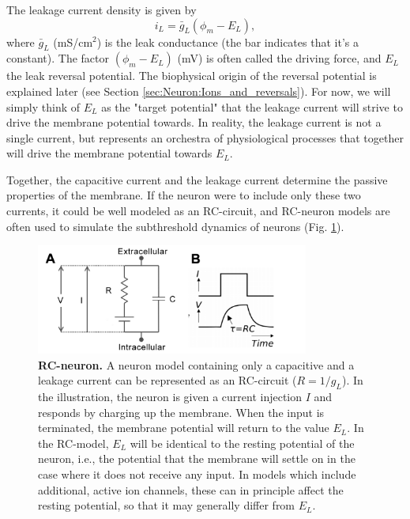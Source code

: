 \subsubsection{}
\label{sec:Neuron:leak}

The leakage current density is given by
\begin{equation}
i_L = \bar{g}_L (\phi_m - E_L),
\label{Neuron:eq:HHleak}
\end{equation}
where $\bar{g}_L$ (mS/cm$^2$) is the leak conductance (the bar indicates that it's a constant). The factor $(\phi_m - E_L)$ (mV) is often called the driving force, and $E_L$ the leak reversal potential. The biophysical origin of the reversal potential is explained later (see Section \ref{sec:Neuron:Ions_and_reversals}). For now, we will simply think of $E_L$ as the "target potential" that the leakage current will strive to drive the membrane potential towards. In reality, the leakage current is not a single current, but represents an orchestra of physiological processes that together will drive the membrane potential towards $E_L$. 

Together, the capacitive current and the leakage current determine the passive properties of the membrane. If the neuron were to include only these two currents, it could be well modeled as an RC-circuit, and RC-neuron models are often used to simulate the subthreshold dynamics of neurons (Fig. \ref{Neuron:fig:RC}). 

\begin{figure}[!ht]
\begin{center}
\includegraphics[width=0.8\textwidth]{Figures/Neuron/RCneuron.png}
\end{center}
\caption{\textbf{RC-neuron.}  A neuron model containing only a capacitive and a leakage current can be represented as an RC-circuit ($R = 1/g_L$). In the illustration, the neuron is given a current injection $I$ and responds by charging up the membrane. When the input is terminated, the membrane potential will return to the value $E_L$. In the RC-model, $E_L$ will be identical to the resting potential of the neuron, i.e., the potential that the membrane will settle on in the case where it does not receive any input. In models which include additional, active ion channels, these can in principle affect the resting potential, so that it may generally differ from $E_L$.
}
\label{Neuron:fig:RC}
\end{figure}


